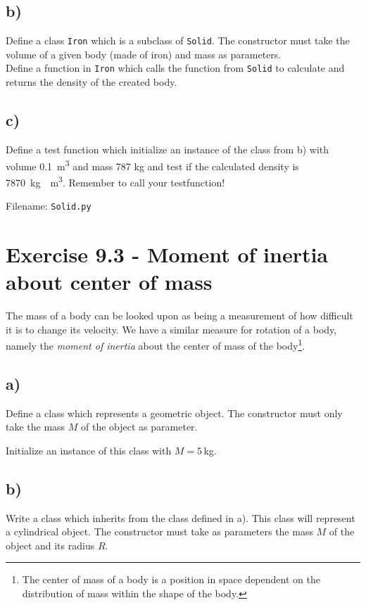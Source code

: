 \documentclass[10pt,a4paper]{article}
\begin{document}
\subsection*{b)}
Define a class \texttt{Iron} which is a subclass of \texttt{Solid}. 
The constructor must take the volume of a given body (made of iron) and mass as parameters. \\
Define a function in \texttt{Iron} which calls the function from \texttt{Solid} to calculate and returns the density of the created body. 

\subsection*{c)}
Define a test function which initialize an instance of the class from b) with volume \SI{0.1}{\cubic\meter} and mass 787 kg and test if the calculated density is \SI{7870}{\kg.\per\cubic\meter}. Remember to call your testfunction!

Filename: \texttt{Solid.py}
 
\section*{Exercise 9.3 - Moment of inertia about center of mass}
The mass of a body can be looked upon as being a measurement of how difficult it is to change its velocity. We have a similar measure for rotation of a body, namely the \textit{moment of inertia} about the center of mass of the body\footnote{The center of mass of a body is a position in space dependent on the distribution of mass within the shape of the body.}. 
\subsection*{a)}
Define a class which represents a geometric object. The constructor must only take the mass $M$ of the object as parameter. 

Initialize an instance of this class with $M = 5\,$kg.
\subsection*{b)}
Write a class which inherits from the class defined in a). This class will represent a cylindrical object. The constructor must take as parameters the mass $M$ of the object and its radius $R$.
\end{document}
